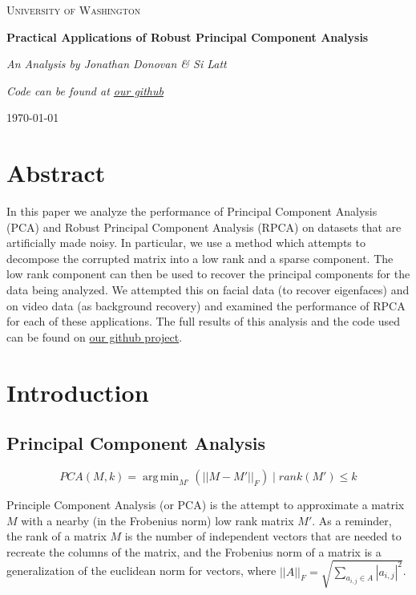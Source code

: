 \documentclass[11pt]{scrartcl} %
\DeclareMathOperator*{\argmin}{arg\,min}
\theoremstyle{plain}
\begin{document}
\begin{titlepage}
	\centering
	{\scshape\LARGE University of Washington\par}
	\vspace{1.5cm}
	{\huge\bfseries Practical Applications of Robust Principal Component Analysis\par}
	\vspace{2cm}
	{\Large\itshape  An Analysis by Jonathan Donovan \& Si Latt\par}

	\vfill

	{\itshape Code can be found at \href{https://github.com/Cynocracy/principal-component-analysis}{our github} \par}
	{\large \today\par}
\end{titlepage}


\section{Abstract}
In this paper we analyze the performance of Principal Component Analysis (PCA) and Robust Principal Component Analysis (RPCA) on datasets that are artificially made noisy. In particular, we use a method\cite{pcp} which attempts to decompose the corrupted matrix into a low rank and a sparse component. The low rank component can then be used to recover the principal components for the data being analyzed. We attempted this on facial data (to recover eigenfaces) and on video data (as background recovery) and examined the performance of RPCA for each of these applications. The full results of this analysis and the code used can be found on \href{https://github.com/Cynocracy/principal-component-analysis}{our github project}.

\section{Introduction}

\subsection{Principal Component Analysis}

\[ PCA(M, k) =\argmin_{M'}(||M-M'||_F ) \mid rank(M') \le k \]

Principle Component Analysis\cite{pca} (or PCA) is the attempt to approximate a matrix $M$ with a nearby (in the Frobenius norm) low rank matrix $M'$. As a reminder, the rank of a matrix $M$ is the number of independent vectors that are needed to recreate the columns of the matrix, and the Frobenius norm of a matrix is a generalization of the euclidean norm for vectors, where $||A||_F = \sqrt{\sum_{a_{i,j} \in A}|a_{i,j}|^2}$.
\end{document}
